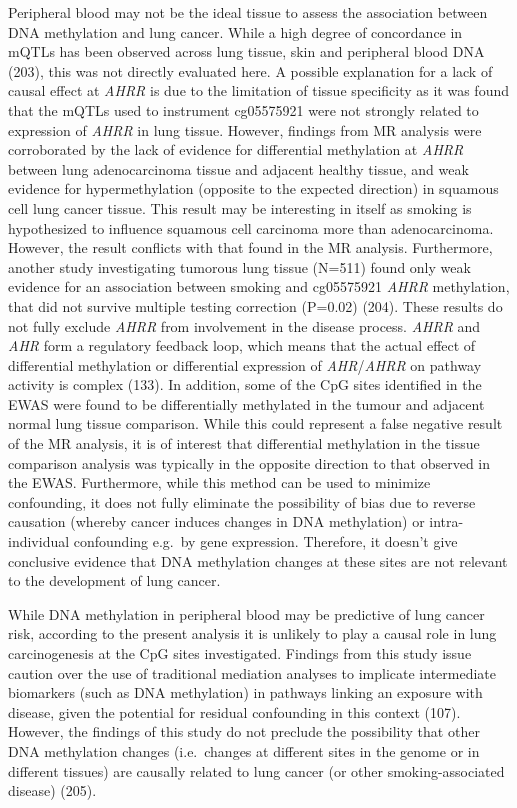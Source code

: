 \documentclass[11pt,oneside]{bristolthesis}
\begin{document}
Peripheral blood may not be the ideal tissue to assess the association between DNA methylation and lung cancer. While a high degree of concordance in mQTLs has been observed across lung tissue, skin and peripheral blood DNA (203), this was not directly evaluated here. A possible explanation for a lack of causal effect at \emph{AHRR} is due to the limitation of tissue specificity as it was found that the mQTLs used to instrument cg05575921 were not strongly related to expression of \emph{AHRR} in lung tissue. However, findings from MR analysis were corroborated by the lack of evidence for differential methylation at \emph{AHRR} between lung adenocarcinoma tissue and adjacent healthy tissue, and weak evidence for hypermethylation (opposite to the expected direction) in squamous cell lung cancer tissue. This result may be interesting in itself as smoking is hypothesized to influence squamous cell carcinoma more than adenocarcinoma. However, the result conflicts with that found in the MR analysis. Furthermore, another study investigating tumorous lung tissue (N=511) found only weak evidence for an association between smoking and cg05575921 \emph{AHRR} methylation, that did not survive multiple testing correction (P=0.02) (204). These results do not fully exclude \emph{AHRR} from involvement in the disease process. \emph{AHRR} and \emph{AHR} form a regulatory feedback loop, which means that the actual effect of differential methylation or differential expression of \emph{AHR}/\emph{AHRR} on pathway activity is complex (133). In addition, some of the CpG sites identified in the EWAS were found to be differentially methylated in the tumour and adjacent normal lung tissue comparison. While this could represent a false negative result of the MR analysis, it is of interest that differential methylation in the tissue comparison analysis was typically in the opposite direction to that observed in the EWAS. Furthermore, while this method can be used to minimize confounding, it does not fully eliminate the possibility of bias due to reverse causation (whereby cancer induces changes in DNA methylation) or intra-individual confounding e.g.~by gene expression. Therefore, it doesn't give conclusive evidence that DNA methylation changes at these sites are not relevant to the development of lung cancer.

While DNA methylation in peripheral blood may be predictive of lung cancer risk, according to the present analysis it is unlikely to play a causal role in lung carcinogenesis at the CpG sites investigated. Findings from this study issue caution over the use of traditional mediation analyses to implicate intermediate biomarkers (such as DNA methylation) in pathways linking an exposure with disease, given the potential for residual confounding in this context (107). However, the findings of this study do not preclude the possibility that other DNA methylation changes (i.e.~changes at different sites in the genome or in different tissues) are causally related to lung cancer (or other smoking-associated disease) (205).
\end{document}

